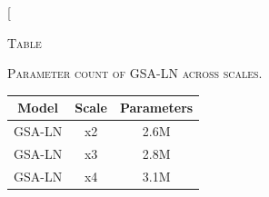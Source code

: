 \documentclass[conference]{IEEEtran}
\begin{document}
\twocolumn[
\begin{@twocolumnfalse}
\centering
{}
\label{tab:params}
{\footnotesize \textsc{Table }\\}
{\footnotesize \textsc{Parameter count of GSA-LN across scales.}\par}
\vspace{0.25\baselineskip}
\begin{tabular}{ccc}
\toprule
Model & Scale & Parameters \\
\midrule
GSA-LN & x2 & 2.6M \\
GSA-LN & x3 & 2.8M \\
GSA-LN & x4 & 3.1M \\
\bottomrule
\end{tabular}
\vspace{0.8\baselineskip}


\end{@twocolumnfalse}
\end{document}

